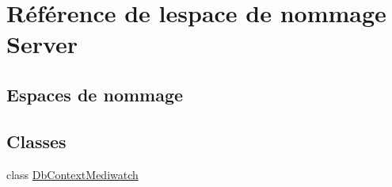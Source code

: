 \hypertarget{namespace_server}{}\section{Référence de l\textquotesingle{}espace de nommage Server}
\label{namespace_server}
\subsection*{Espaces de nommage}
\begin{DoxyCompactItemize}
\end{DoxyCompactItemize}
\subsection*{Classes}
\begin{DoxyCompactItemize}
\item 
class \hyperlink{class_server_1_1_db_context_mediwatch}{Db\+Context\+Mediwatch}
\end{DoxyCompactItemize}
